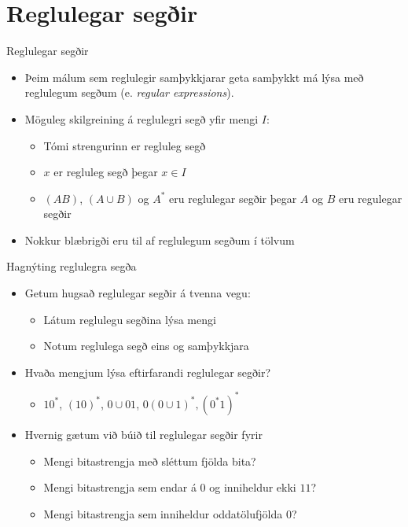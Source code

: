 \documentclass[handout]{beamer}
\begin{document}
\section{Reglulegar segðir}

\begin{frame}{Reglulegar segðir}
    \begin{itemize}
        \item Þeim málum sem reglulegir samþykkjarar geta samþykkt má lýsa með reglulegum segðum (e. \emph{regular expressions}).
        \item Möguleg skilgreining á reglulegri segð yfir mengi $I$:
        \begin{itemize}
            \item Tómi strengurinn er regluleg segð
            \item $x$ er regluleg segð þegar $x \in I$
            \item $(AB)$, $(A \cup B)$ og $A^*$ eru reglulegar segðir þegar $A$ og $B$ eru regulegar segðir
        \end{itemize}
        \item Nokkur blæbrigði eru til af reglulegum segðum í tölvum
    \end{itemize}
\end{frame}

\begin{frame}{Hagnýting reglulegra segða}
    \begin{itemize}
        \item Getum hugsað reglulegar segðir á tvenna vegu:
        \begin{itemize}
            \item Látum reglulegu segðina lýsa mengi
            \item Notum reglulega segð eins og samþykkjara
        \end{itemize}
        \item Hvaða mengjum lýsa eftirfarandi reglulegar segðir?
        \begin{itemize}
            \item $10^*$, $(10)^*$, $0 \cup 01$, $0(0 \cup 1)^*, (0^*1)^*$
        \end{itemize}
        \item Hvernig gætum við búið til reglulegar segðir fyrir
        \begin{itemize}
            \item Mengi bitastrengja með sléttum fjölda bita?
            \item Mengi bitastrengja sem endar á $0$ og inniheldur ekki $11$?
            \item Mengi bitastrengja sem inniheldur oddatölufjölda 0?
        \end{itemize}
    \end{itemize}
\end{frame}
\end{document}
